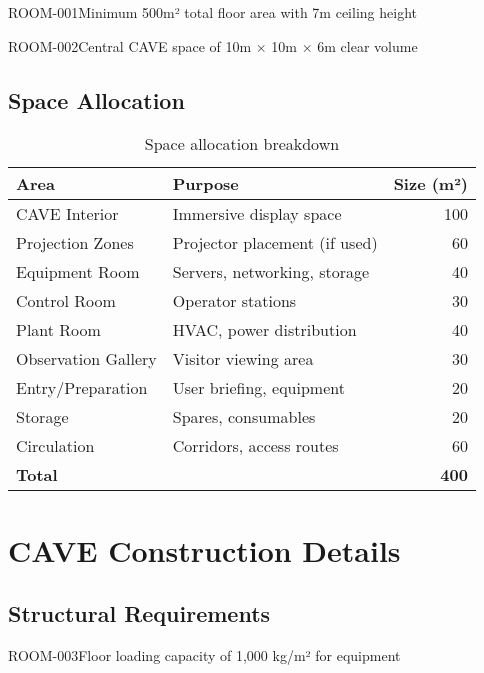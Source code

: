 \begin{requirement}{ROOM-001}{Minimum 500m² total floor area with 7m ceiling height}

\begin{requirement}{ROOM-002}{Central CAVE space of 10m × 10m × 6m clear volume}

\subsection{Space Allocation}

\begin{table}[H]
\centering
\begin{tabularx}{\textwidth}{@{}lXr@{}}
\toprule
\textbf{Area} & \textbf{Purpose} & \textbf{Size (m²)} \\
\midrule
CAVE Interior & Immersive display space & 100 \\
Projection Zones & Projector placement (if used) & 60 \\
Equipment Room & Servers, networking, storage & 40 \\
Control Room & Operator stations & 30 \\
Plant Room & HVAC, power distribution & 40 \\
Observation Gallery & Visitor viewing area & 30 \\
Entry/Preparation & User briefing, equipment & 20 \\
Storage & Spares, consumables & 20 \\
Circulation & Corridors, access routes & 60 \\
\midrule
\textbf{Total} & & \textbf{400} \\
\bottomrule
\end{tabularx}
\caption{Space allocation breakdown}
\end{table}

\section{CAVE Construction Details}

\subsection{Structural Requirements}

\begin{requirement}{ROOM-003}{Floor loading capacity of 1,000 kg/m² for equipment}

\begin{figure}[H]
\centering
{}
\end{figure}
\end{requirement}
\end{requirement}
\end{requirement}
